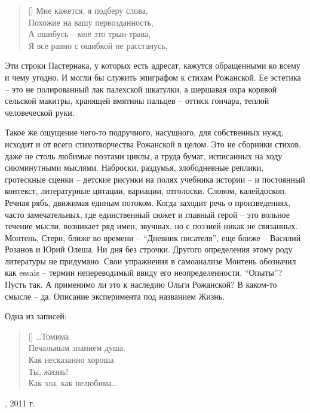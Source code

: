 \documentclass[12pt,a5paper,twoside]{article}
\begin{document}
\settowidth{\versewidth}{Мне кажется, я подберу слова,}
\begin{verse}[\versewidth]
Мне кажется, я подберу слова,\\
Похожие на вашу первозданность,\\ 
А ошибусь -- мне это трын-трава,\\
Я все равно с ошибкой не расстанусь,
\end{verse}

Эти строки Пастернака, у которых есть адресат, кажутся обращенными ко всему и чему угодно. И 
могли бы служить эпиграфом к стихам Рожанской. Ее эстетика -- это не полированный лак палехской шкатулки, 
а шершавая охра корявой сельской макитры, хранящей вмятины пальцев -- оттиск гончара, теплой человеческой руки.

Такое же ощущение чего-то подручного, насущного, для собственных нужд, исходит и от всего стихотворчества 
Рожанской в целом. Это не сборники стихов, даже не столь любимые поэтами циклы, а груда бумаг, исписанных на 
ходу сиюминутными мыслями. Наброски, раздумья, злободневные реплики, гротескные сценки -- детские рисунки на 
полях учебника истории -- и постоянный контекст, литературные цитации, вариации, отголоски. Словом, калейдоскоп. 
Речная рябь, движимая единым потоком. Когда заходит речь о произведениях, часто замечательных, где единственный 
сюжет и главный герой -- это вольное течение мысли, возникает ряд имен, звучных, но с поэзией никак не связанных. 
Монтень, Стерн, ближе во времени -- ``Дневник писателя'', еще ближе -- Василий Розанов и Юрий Олеша. Ни дня без 
строчки. Другого определения этому роду литературы не придумано. Свои упражнения в самоанализе Монтень 
обозначил как essais -- термин непереводимый ввиду его неопределенности. ``Опыты''? Пусть так. А применимо ли 
это к наследию Ольги Рожанской? В каком-то смысле -- да. Описание эксперимента под названием Жизнь.

Одна из записей:

\settowidth{\versewidth}{…Томима}
\begin{verse}[\versewidth]
…Томима\\
Печальным знанием душа.\\
Как несказанно хороша\\
Ты, жизнь!\\
Как зла, как нелюбима…
\end{verse}
\begin{flushright}
, 2011 г.
\end{flushright}
\clearpage
\end{document}
